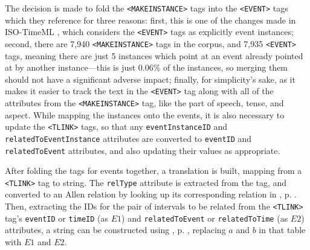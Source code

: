 \documentclass[a4paper,12pt,leqno,twoside]{article}
\begin{document}
The decision is made to fold the \verb|<MAKEINSTANCE>| tags into the \verb|<EVENT>| tags which they reference for three reasons: first, this is one of the changes made in ISO-TimeML \citep{pustejovsky2010iso}, which considers the \verb|<EVENT>| tags as explicitly event instances; second, there are 7,940 \verb|<MAKEINSTANCE>| tags in the corpus, and 7,935 \verb|<EVENT>| tags, meaning there are just 5 instances which point at an event already pointed at by another instance---this is just 0.06\% of the instances, so merging them should not have a significant adverse impact; finally, for simplicity's sake, as it makes it easier to track the text in the \verb|<EVENT>| tag along with all of the attributes from the \verb|<MAKEINSTANCE>| tag, like the part of speech, tense, and aspect. While mapping the instances onto the events, it is also necessary to update the \verb|<TLINK>| tags, so that any \verb|eventInstanceID| and \verb|relatedToEventInstance| attributes are converted to \verb|eventID| and \verb|relatedToEvent| attributes, and also updating their values as appropriate.

After folding the tags for events together, a translation is built, mapping from a \verb|<TLINK>| tag to string. The \verb|relType| attribute is extracted from the tag, and converted to an Allen relation by looking up its corresponding relation in , p. \pageref{fig:tlink-allen-translation}. Then, extracting the IDs for the pair of intervals to be related from the \verb|<TLINK>| tag's \verb|eventID| or \verb|timeID| (as $E1$) and \verb|relatedToEvent| or \verb|relatedToTime| (as $E2$) attributes, a string can be constructed using , p. \pageref{tab:allen-rels-strings}, replacing $a$ and $b$ in that table with $E1$ and $E2$.
\end{document}
